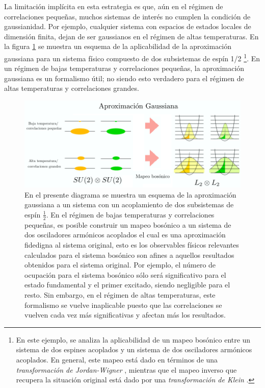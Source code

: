\documentclass{report} %
\numberwithin{equation}{section}
\begin{document}
La limitación implícita en esta estrategia es que, aún en el régimen de correlaciones pequeñas, muchos sistemas de interés no  cumplen la condición de gaussianidad. Por ejemplo, cualquier sistema con espacios de estados locales de dimensión finita, dejan de ser gaussianos en el régimen de altas temperaturas. En la figura \ref{Aproximacion Gaussiana} se muestra un esquema de la aplicabilidad de la aproximación gaussiana para un sistema físico compuesto de dos subsistemas de espín 1/2 \footnote{En este ejemplo, se analiza la aplicabilidad de un mapeo bosónico entre un sistema de dos espines acoplados y un sistema de dos osciladores armónicos acoplados. En general, este mapeo está dado en términos de una \textit{transformación de Jordan-Wigner} \cite{Nielsen.00}, mientras que el mapeo inverso que recupera la situación original está dado por una \textit{transformación de Klein} \cite{ringwood}.}. En un régimen de bajas temperaturas y correlaciones pequeñas, la aproximación gaussiana es un formalismo útil; no siendo esto verdadero para el régimen de altas temperaturas y correlaciones grandes. 
\begin{figure}
    \centering
    \includegraphics[scale = 0.57]{figs/Aproximacion Gaussiana.png}
    \caption{En el presente diagrama se muestra un esquema de la aproximación gaussiana a un sistema con un acoplamiento de dos subsistemas de espín $\frac{1}{2}$. En el régimen de bajas temperaturas y correlaciones pequeñas, es posible construir un mapeo bosónico a un sistema de dos osciladores armónicos acoplados el cual es una aproximación fidedigna al sistema original, esto es los observables físicos relevantes calculados para el sistema bosónico son afines a aquellos resultados obtenidos para el sistema original. Por ejemplo, el número de ocupación para el sistema bosónico sólo será significativo para el estado fundamental y el primer excitado, siendo negligible para el resto. Sin embargo, en el régimen de altas temperaturas, este formalismo se vuelve inaplicable puesto que las correlaciones se vuelven cada vez más significativas y afectan más los resultados.}
    \label{Aproximacion Gaussiana}
\end{figure}
\end{document}
